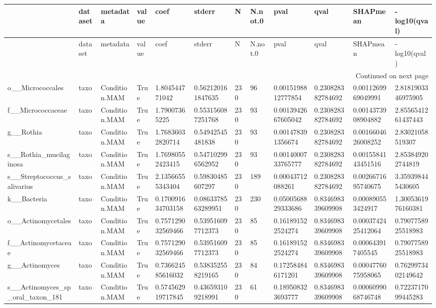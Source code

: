 \begin{longtable}{llllllllllll}
\toprule
 & dataset & metadata & value & coef & stderr & N & N.not.0 & pval & qval & SHAPmean & -log10(qval) \\
\midrule
\endfirsthead
\toprule
 & dataset & metadata & value & coef & stderr & N & N.not.0 & pval & qval & SHAPmean & -log10(qval) \\
\midrule
\endhead
\midrule
\multicolumn{12}{r}{Continued on next page} \\
\midrule
\endfoot
\bottomrule
\endlastfoot
o\_\_Micrococcales & taxo & Condition.MAM & True & 1.804544771042 & 0.562120161847635 & 230 & 96 & 0.0015198812777854 & 0.230828382784692 & 0.0011269969049991 & 2.8181903346975905 \\
f\_\_Micrococcaceae & taxo & Condition.MAM & True & 1.79007365225 & 0.553156087251768 & 230 & 93 & 0.0013942667605042 & 0.230828382784692 & 0.0014373908904882 & 2.8556541261437443 \\
g\_\_Rothia & taxo & Condition.MAM & True & 1.76836032820714 & 0.54942545481838 & 230 & 93 & 0.001478391356674 & 0.230828382784692 & 0.0016604626008252 & 2.83021058519307 \\
s\_\_Rothia\_mucilaginosa & taxo & Condition.MAM & True & 1.76980552423415 & 0.547102996562952 & 230 & 93 & 0.0014000733765777 & 0.230828382784692 & 0.0015584143451516 & 2.853849202744819 \\
s\_\_Streptococcus\_salivarius & taxo & Condition.MAM & True & 2.13566555343404 & 0.59830485607297 & 230 & 189 & 0.00043712088261 & 0.230828382784692 & 0.0026671695740675 & 3.359398445430605 \\
k\_\_Bacteria & taxo & Condition.MAM & True & 0.170091634703158 & 0.0863378563289951 & 230 & 230 & 0.0500568829333686 & 0.834698339609908 & 0.000890553424917 & 1.3005361976160381 \\
o\_\_Actinomycetales & taxo & Condition.MAM & True & 0.757129032569466 & 0.539516097712373 & 230 & 85 & 0.161891522524274 & 0.834698339609908 & 0.0003742425412064 & 0.7907758925518983 \\
f\_\_Actinomycetaceae & taxo & Condition.MAM & True & 0.757129032569466 & 0.539516097712373 & 230 & 85 & 0.161891522524274 & 0.834698339609908 & 0.000643917405545 & 0.7907758925518983 \\
g\_\_Actinomyces & taxo & Condition.MAM & True & 0.736624585616032 & 0.538352558219165 & 230 & 84 & 0.172584846171201 & 0.834698339609908 & 0.0004776075958065 & 0.7629973402149642 \\
s\_\_Actinomyces\_sp\_oral\_taxon\_181 & taxo & Condition.MAM & True & 0.574562919717845 & 0.436593109218991 & 230 & 61 & 0.189508323693777 & 0.834698339609908 & 0.0006099068746748 & 0.7223717099445283 \\

\end{longtable}
